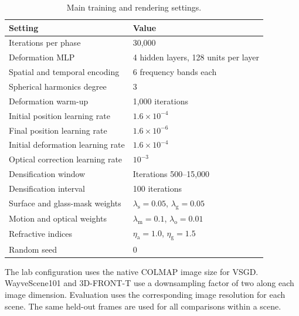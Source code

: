 \begin{table}[!htbp]
  \centering
  \caption{Main training and rendering settings.}
  \label{tab:training-config}
  \small
  \begin{tabularx}{\linewidth}{@{}Xl@{}}
    \toprule
    Setting & Value\\
    \midrule
    Iterations per phase & 30,000\\
    Deformation MLP & 4 hidden layers, 128 units per layer\\
    Spatial and temporal encoding & 6 frequency bands each\\
    Spherical harmonics degree & 3\\
    Deformation warm-up & 1,000 iterations\\
    Initial position learning rate & $1.6\times10^{-4}$\\
    Final position learning rate & $1.6\times10^{-6}$\\
    Initial deformation learning rate & $1.6\times10^{-4}$\\
    Optical correction learning rate & $10^{-3}$\\
    Densification window & Iterations 500--15,000\\
    Densification interval & 100 iterations\\
    Surface and glass-mask weights & $\lambda_{\mathrm{s}}=0.05$, $\lambda_{\mathrm{g}}=0.05$\\
    Motion and optical weights & $\lambda_{\mathrm{m}}=0.1$, $\lambda_{\mathrm{o}}=0.01$\\
    Refractive indices & $\eta_{\mathrm{a}}=1.0$, $\eta_{\mathrm{g}}=1.5$\\
    Random seed & 0\\
    \bottomrule
  \end{tabularx}
\end{table}

The lab configuration uses the native COLMAP image size for VSGD. WayveScene101 and 3D-FRONT-T use a downsampling factor of two along each image dimension. Evaluation uses the corresponding image resolution for each scene. The same held-out frames are used for all comparisons within a scene.
